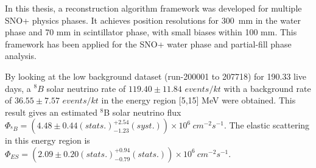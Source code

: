 In this thesis, a reconstruction algorithm framework was developed for multiple SNO+ physics phases. It achieves position resolutions for 300~mm in the water phase and 70 mm in scintillator phase, with small biases within 100 mm. This framework has been applied for the SNO+ water phase and partial-fill phase analysis. 

By looking at the low background dataset (run-200001 to 207718) for 190.33 live days, a $^8B$ solar neutrino rate of $119.40\pm11.84$ $events/kt$ with a background rate of $36.55\pm7.57$ $events/kt$ in the energy region [5,15] MeV were obtained. This result gives an estimated $^8$B solar neutrino flux $\Phi_{^8B}=(4.48 \pm 0.44(stats.)^{+2.54}_{-1.23}(syst.))\times10^6~cm^{-2}s^{-1}$. The elastic scattering in this energy region is $\Phi_{ES}=(2.09 \pm 0.20(stats.)^{+0.94}_{-0.79}(stats.))\times10^6~cm^{-2}s^{-1}$.


